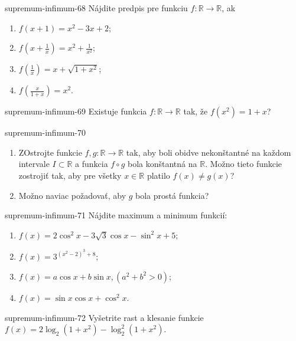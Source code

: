 \begin{defproblem}{supremum-infimum-68}
Nájdite predpis pre funkciu $f:\mathbb{R}\rightarrow\mathbb{R}$, ak
\begin{multicols}{2}
\begin{enumerate}
    \item $f(x+1)=x^2-3x+2$;
    \item $f(x+\frac{1}{x})=x^2+\frac{1}{x^2}$;
    \item $f(\frac{1}{x})=x+\sqrt{1+x^2}$;
    \item $f(\frac{x}{1+x})=x^2$.
\end{enumerate}
\end{multicols}
\end{defproblem}

\begin{defproblem}{supremum-infimum-69}
Existuje funkcia $f:\mathbb{R}\rightarrow\mathbb{R}$ tak, že $f(x^2)=1+x$?
\end{defproblem}

\begin{defproblem}{supremum-infimum-70}
\begin{enumerate}
\item ZOstrojte funkcie $f,g:\mathbb{R}\rightarrow\mathbb{R}$ tak, aby boli obidve nekonštantné na každom intervale $I\subset\mathbb{R}$ a funkcia $f\circ g$ bola konštantná na $\mathbb{R}$. Možno tieto funkcie zostrojiť tak, aby pre všetky $x\in\mathbb{R}$ platilo $f(x)\neq g(x)$?
\item Možno naviac požadovať, aby $g$ bola prostá funkcia?
\end{enumerate}
\end{defproblem}

\begin{defproblem}{supremum-infimum-71}
Nájdite maximum a minimum funkcií:
\begin{multicols}{2}
\begin{enumerate}
    \item $f(x)=2\cos^2 x -3\sqrt{3}\cos x -\sin^2 x +5$;
    \item $f(x)=3^{(x^2-2)^3+8}$;
    \item $f(x)=a\cos x +b\sin x ,(a^2+b^2>0)$;
    \item $f(x)=\sin x \cos x +\cos^2 x$.
\end{enumerate}
\end{multicols}
\end{defproblem}

\begin{defproblem}{supremum-infimum-72}
Vyšetrite rast a klesanie funkcie $f(x)=2\log_2(1+x^2)-\log_2^2(1+x^2)$.
\end{defproblem}

